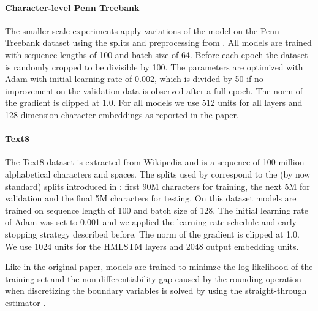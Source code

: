 \paragraph{Character-level Penn Treebank --}
The smaller-scale experiments apply variations of the model on the Penn Treebank dataset 
\citep{marcus1993building} using the splits and preprocessing from \cite{mikolovsubword}. 
All models are trained with sequence lengths of 100 and batch size of 64.
Before each epoch the dataset is randomly cropped to be divisible by 100. 
The parameters are optimized with Adam \citep{kingma2014adam}
with initial learning rate of 0.002, 
which is divided by 50 if no improvement on the validation data is observed 
after a full epoch. The norm of the gradient is clipped at 1.0. For all models 
we use 512 units for all layers and 128 dimension character embeddings as 
reported in the paper.

\paragraph{Text8 --}
The Text8 dataset \citep{mahoney2011large} is extracted from Wikipedia and is 
a sequence of 100 million alphabetical characters and spaces. The 
splits used by \cite{chung2016hierarchical} correspond to the (by now standard) 
splits introduced in \cite{mikolovsubword}: first 90M characters for training, 
the next 5M for validation and the final 5M characters for testing. On this dataset 
models are trained on sequence length of 100 and batch size of 128.
The initial learning rate of Adam was set to 0.001 and we applied the 
learning-rate schedule and early-stopping strategy described before. 
The norm of the gradient is clipped at 1.0. We use 1024
units for the HMLSTM layers and 2048 output embedding units.

Like in the original paper, models are trained to minimze the log-likelihood of the training set and
the non-differentiability gap caused by the rounding operation when 
discretizing the boundary variables is solved by using the straight-through 
estimator \citep{bengio2013estimating}.



